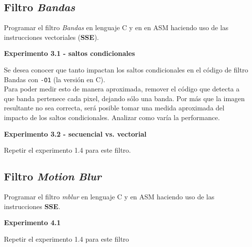 \subsection{Filtro \textit{Bandas}}

Programar el filtro \textit{Bandas} en lenguaje C y en en ASM haciendo uso de 
las instrucciones vectoriales (\textbf{SSE}).

\vspace*{0.3cm} \noindent
\textbf{Experimento 3.1 - saltos condicionales}

Se desea conocer que tanto impactan los saltos condicionales en el código 
de filtro Bandas con \verb|-O1| (la versión en C).\\
Para poder medir esto de manera aproximada, remover el código
que detecta a que banda pertenece cada pixel, dejando
sólo una banda.
Por más que la imagen resultante no sea correcta, será posible tomar una
medida aproximada del impacto de los saltos condicionales.
Analizar como varía la performance. 

\vspace*{0.3cm} \noindent
\textbf{Experimento 3.2 - secuencial vs. vectorial}

Repetir el experimento 1.4 para este filtro.


\subsection{Filtro \textit{Motion Blur}}
Programar el filtro \textit{mblur} en lenguaje C y en ASM haciendo uso de 
las instrucciones \textbf{SSE}.

\vspace*{0.3cm} \noindent
\textbf{Experimento 4.1}

Repetir el experimento 1.4 para este filtro
